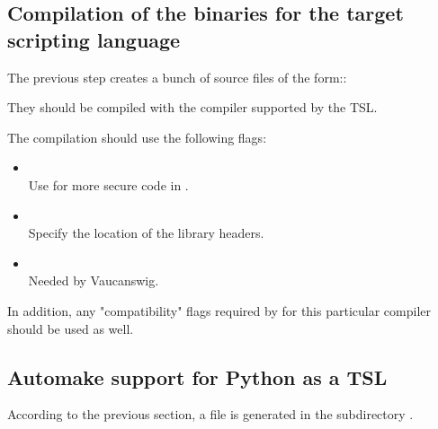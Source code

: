 \subsection{Compilation of the binaries for the target scripting language}

The previous step creates a bunch of \Cxx source files of the form::


They should be compiled with the \Cxx compiler supported by the TSL.

The \Cxx compilation should use the following flags:

\begin{itemize}
\item {}\\
  Use for more secure code in \Vauc.

\item {}\\
  Specify the location of the \Vauc library headers.

\item {}\\
  Needed by Vaucanswig.
\end{itemize}

In addition, any "compatibility" flags required by \Vauc for this
particular \Cxx compiler should be used as well.


\subsection{Automake support for Python as a TSL}

According to the previous section, a  file is
generated in the subdirectory .

